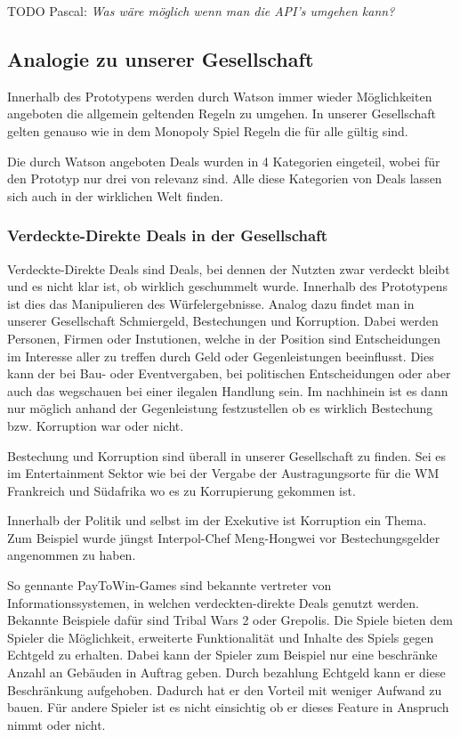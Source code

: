 \documentclass[german]{cgspaper} %
\newcommand{\todo}[1]{\textit{#1}}
\newcommand{\Pascal}[1]{\textcolor{colorPascal}{TODO Pascal:} \todo{#1} }
\begin{document}
\Pascal{Was wäre möglich wenn man die API's umgehen kann?}

\subsection{Analogie zu unserer Gesellschaft}

Innerhalb des Prototypens werden durch Watson immer wieder Möglichkeiten angeboten die allgemein geltenden Regeln zu umgehen.
In unserer Gesellschaft gelten genauso wie in dem Monopoly Spiel Regeln die für alle gültig sind.

Die durch Watson angeboten Deals wurden in 4 Kategorien eingeteil, wobei für den Prototyp nur drei von relevanz sind.
Alle diese Kategorien von Deals lassen sich auch in der wirklichen Welt finden.

\subsubsection{Verdeckte-Direkte Deals in der Gesellschaft}

Verdeckte-Direkte Deals sind Deals, bei dennen der Nutzten zwar verdeckt bleibt und es nicht klar ist, ob wirklich geschummelt wurde.
Innerhalb des Prototypens ist dies das Manipulieren des Würfelergebnisse. 
Analog dazu findet man in unserer Gesellschaft Schmiergeld, Bestechungen und Korruption.
Dabei werden Personen, Firmen oder Instutionen, welche in der Position sind Entscheidungen im Interesse aller zu treffen durch Geld oder Gegenleistungen beeinflusst.
Dies kann der bei Bau- oder Eventvergaben, bei politischen Entscheidungen oder aber auch das wegschauen bei einer ilegalen Handlung sein.
Im nachhinein ist es dann nur möglich anhand der Gegenleistung festzustellen ob es wirklich Bestechung bzw. Korruption war oder nicht.

Bestechung und Korruption sind überall in unserer Gesellschaft zu finden.
Sei es im Entertainment Sektor wie bei der Vergabe der Austragungsorte für die WM Frankreich und Südafrika wo es zu Korrupierung gekommen ist. \cite{FAZWM2015}

Innerhalb der Politik und selbst im der Exekutive ist Korruption ein Thema.
Zum Beispiel wurde jüngst Interpol-Chef Meng-Hongwei vor Bestechungsgelder angenommen zu haben. \cite{NTVINTERPOL2018}

So gennante PayToWin-Games sind bekannte vertreter von Informationssystemen, in welchen verdeckten-direkte Deals genutzt werden.
Bekannte Beispiele dafür sind Tribal Wars 2 oder Grepolis.
Die Spiele bieten dem Spieler die Möglichkeit, erweiterte Funktionalität und Inhalte des Spiels gegen Echtgeld zu erhalten.
Dabei kann der Spieler zum Beispiel nur eine beschränke Anzahl an Gebäuden in Auftrag geben.
Durch bezahlung Echtgeld kann er diese Beschränkung aufgehoben.
Dadurch hat er den Vorteil mit weniger Aufwand zu bauen.
Für andere Spieler ist es nicht einsichtig ob er dieses Feature in Anspruch nimmt oder nicht.
\end{document}
